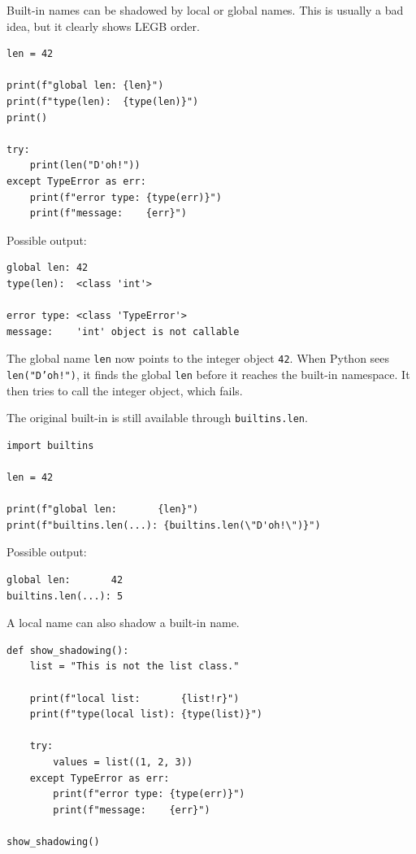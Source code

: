Built-in names can be shadowed by local or global names. This is usually a bad idea, but it clearly shows LEGB order.

\begin{verbatim}
len = 42

print(f"global len: {len}")
print(f"type(len):  {type(len)}")
print()

try:
    print(len("D'oh!"))
except TypeError as err:
    print(f"error type: {type(err)}")
    print(f"message:    {err}")
\end{verbatim}

Possible output:

\begin{verbatim}
global len: 42
type(len):  <class 'int'>

error type: <class 'TypeError'>
message:    'int' object is not callable
\end{verbatim}

The global name \texttt{len} now points to the integer object \texttt{42}. When Python sees \texttt{len("D'oh!")}, it finds the global \texttt{len} before it reaches the built-in namespace. It then tries to call the integer object, which fails.

The original built-in is still available through \texttt{builtins.len}.

\begin{verbatim}
import builtins

len = 42

print(f"global len:       {len}")
print(f"builtins.len(...): {builtins.len(\"D'oh!\")}")
\end{verbatim}

Possible output:

\begin{verbatim}
global len:       42
builtins.len(...): 5
\end{verbatim}

A local name can also shadow a built-in name.

\begin{verbatim}
def show_shadowing():
    list = "This is not the list class."

    print(f"local list:       {list!r}")
    print(f"type(local list): {type(list)}")

    try:
        values = list((1, 2, 3))
    except TypeError as err:
        print(f"error type: {type(err)}")
        print(f"message:    {err}")

show_shadowing()
\end{verbatim}

